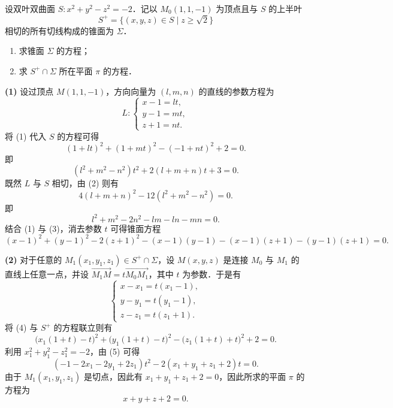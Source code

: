 
设双叶双曲面 $S: x^2+y^2-z^2=-2$．记以 $M_0(1,1,-1)$ 为顶点且与 $S$ 的上半叶
\[
  S^+ = \{(x,y,z)\in S \mid z\ge\sqrt{2}\}
\]
相切的所有切线构成的锥面为 $\Sigma$．
\begin{enumerate}[label=(\arabic*)]
  \item 求锥面 $\Sigma$ 的方程；
  \item 求 $S^+\cap\Sigma$ 所在平面 $\pi$ 的方程．
\end{enumerate}

\begin{solution}
\textbf{(1)} 设过顶点 $M(1,1,-1)$，方向向量为 $(l,m,n)$ 的直线的参数方程为
\begin{equation}
  L:\begin{cases}
    x-1=lt,\\
    y-1=mt,\\
    z+1=nt.
  \end{cases}\tag{1}
\end{equation}
将 (1) 代入 $S$ 的方程可得
\[
  (1+lt)^2+(1+mt)^2-(-1+nt)^2+2=0.
\]
即
\begin{equation}
  (l^2+m^2-n^2)t^2+2(l+m+n)t+3=0.\tag{2}
\end{equation}
既然 $L$ 与 $S$ 相切，由 (2) 则有
\[
  4(l+m+n)^2-12(l^2+m^2-n^2)=0.
\]
即
\begin{equation}
  l^2+m^2-2n^2-lm-ln-mn=0.\tag{3}
\end{equation}
结合 (1) 与 (3)，消去参数 $t$ 可得锥面方程
\[
  (x-1)^2+(y-1)^2-2(z+1)^2-(x-1)(y-1)-(x-1)(z+1)-(y-1)(z+1)=0.
\]

\textbf{(2)} 对于任意的 $M_1(x_1,y_1,z_1)\in S^+\cap\Sigma$，设 $M(x,y,z)$ 是连接 $M_0$ 与 $M_1$ 的直线上任意一点，并设 $\overrightarrow{M_1M}=t\overrightarrow{M_0M_1}$，其中 $t$ 为参数．于是有
\begin{equation}
  \begin{cases}
    x-x_1=t(x_1-1),\\
    y-y_1=t(y_1-1),\\
    z-z_1=t(z_1+1).
  \end{cases}\tag{4}
\end{equation}
将 (4) 与 $S^+$ 的方程联立则有
\begin{equation}
  \bigl(x_1(1+t)-t\bigr)^2+\bigl(y_1(1+t)-t\bigr)^2-\bigl(z_1(1+t)+t\bigr)^2+2=0.\tag{5}
\end{equation}
利用 $x_1^2+y_1^2-z_1^2=-2$，由 (5) 可得
\begin{equation}
  (-1-2x_1-2y_1+2z_1)t^2-2(x_1+y_1+z_1+2)t=0.\tag{6}
\end{equation}
由于 $M_1(x_1,y_1,z_1)$ 是切点，因此有 $x_1+y_1+z_1+2=0$，因此所求的平面 $\pi$ 的方程为
\[
  x+y+z+2=0.
\]
\end{solution}

